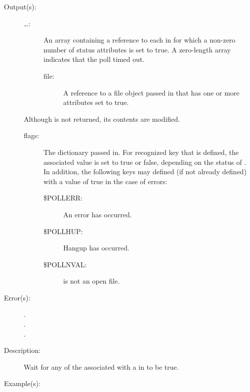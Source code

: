 \begin{description}
\begin{description}
	\item[Output(s): ]
		\begin{description}\item[]
		\item[{\lb}\dots{\rb}: ]
			An array containing a reference to each  in
			\oparg{{\lt}\dots{\gt}} for which a non-zero number of
			status attributes is set to true.  A zero-length array
			indicates that the poll timed out.
			\begin{description}%
			\item[file: ]
				A reference to a file object passed in that has
				one or more attributes set to true.
			\end{description}
		\end{description}
		Although \oparg{{\lt}\dots{\gt}} is not returned, its contents
		are modified.
		\begin{description}\item[]
		\item[flags: ]
			The dictionary passed in.  For recognized key that is
			defined, the associated value is set to true or false,
			depending on the status of .  In addition,
			the following keys may defined (if not already defined)
			with a value of true in the case of errors:
			\begin{description}%
			\item[\$POLLERR: ]
				An error has occurred.
			\item[\$POLLHUP: ]
				Hangup has occurred.
			\item[\$POLLNVAL: ]
				 is not an open file.
			\end{description}
		\end{description}
	\item[Error(s): ]
		\begin{description}\item[]
		\item[.]
		\item[.]
		\item[.]
		\end{description}
	\item[Description: ]
		Wait for any of the  associated with a 
		in \oparg{{\lt}\dots{\gt}} to be true.
	\item[Example(s): ]\begin{verbatim}


\end{verbatim}
\end{description}
\end{description}

